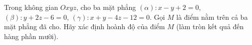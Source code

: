\begin{ex}
Trong không gian $Oxyz$, cho ba mặt phẳng $(\alpha)\colon x-y+2=0$, $(\beta)\colon y+2z-6=0$, $(\gamma)\colon x+y-4z-12=0$. Gọi $M$ là điểm nằm trên cả ba mặt phẳng đã cho. Hãy xác định hoành độ của điểm $M$ (làm tròn kết quả đến hàng phần mười).
\end{ex}
